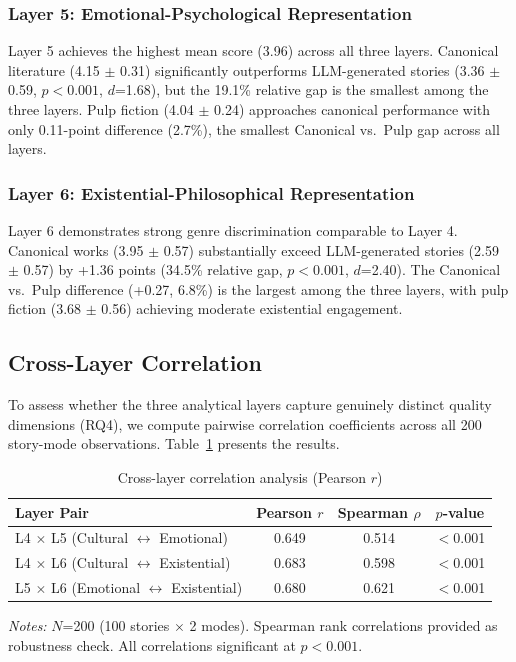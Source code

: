 \subsubsection{Layer 5: Emotional-Psychological Representation}

Layer 5 achieves the highest mean score (3.96) across all three layers. Canonical literature (4.15 $\pm$ 0.31) significantly outperforms LLM-generated stories (3.36 $\pm$ 0.59, $p<0.001$, $d$=1.68), but the 19.1\% relative gap is the smallest among the three layers. Pulp fiction (4.04 $\pm$ 0.24) approaches canonical performance with only 0.11-point difference (2.7\%), the smallest Canonical vs.\ Pulp gap across all layers.

\subsubsection{Layer 6: Existential-Philosophical Representation}

Layer 6 demonstrates strong genre discrimination comparable to Layer 4. Canonical works (3.95 $\pm$ 0.57) substantially exceed LLM-generated stories (2.59 $\pm$ 0.57) by +1.36 points (34.5\% relative gap, $p<0.001$, $d$=2.40). The Canonical vs.\ Pulp difference (+0.27, 6.8\%) is the largest among the three layers, with pulp fiction (3.68 $\pm$ 0.56) achieving moderate existential engagement.

\subsection{Cross-Layer Correlation}

To assess whether the three analytical layers capture genuinely distinct quality dimensions (RQ4), we compute pairwise correlation coefficients across all 200 story-mode observations. Table~\ref{tab:cross_layer_correlation} presents the results.

\begin{table}[t]
\centering
\caption{Cross-layer correlation analysis (Pearson $r$)}
\label{tab:cross_layer_correlation}
\small
\begin{tabular}{lccc}
\toprule
\textbf{Layer Pair} & \textbf{Pearson $r$} & \textbf{Spearman $\rho$} & \textbf{$p$-value} \\
\midrule
L4 $\times$ L5 (Cultural $\leftrightarrow$ Emotional)     & 0.649 & 0.514 & $<$0.001 \\
L4 $\times$ L6 (Cultural $\leftrightarrow$ Existential)   & 0.683 & 0.598 & $<$0.001 \\
L5 $\times$ L6 (Emotional $\leftrightarrow$ Existential)  & 0.680 & 0.621 & $<$0.001 \\
\bottomrule
\end{tabular}
\vspace{0.1cm}

\small
\textit{Notes:} $N$=200 (100 stories $\times$ 2 modes). Spearman rank correlations provided as robustness check. All correlations significant at $p<0.001$.
\end{table}

